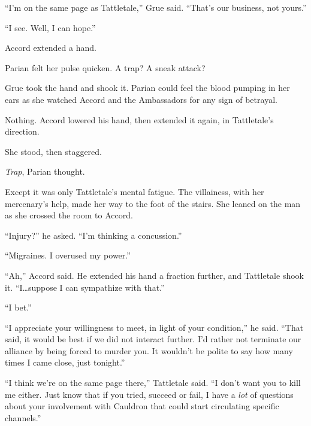 ``I'm on the same page as Tattletale,'' Grue said.  ``That's our business, not yours.''



``I see.  Well, I can hope.''



Accord extended a hand.



Parian felt her pulse quicken.  A trap?  A sneak attack?



Grue took the hand and shook it.  Parian could feel the blood pumping in her ears as she watched Accord and the Ambassadors for any sign of betrayal.



Nothing.  Accord lowered his hand, then extended it again, in Tattletale's direction.



She stood, then staggered.



\emph{Trap}, Parian thought.



Except it was only Tattletale's mental fatigue.  The villainess, with her mercenary's help, made her way to the foot of the stairs.  She leaned on the man as she crossed the room to Accord.



``Injury?'' he asked.  ``I'm thinking a concussion.''



``Migraines.  I overused my power.''



``Ah,'' Accord said.  He extended his hand a fraction further, and Tattletale shook it.  ``I\ldots suppose I can sympathize with that.''



``I bet.''



``I appreciate your willingness to meet, in light of your condition,'' he said.  ``That said, it would be best if we did not interact further.  I'd rather not terminate our alliance by being forced to murder you.  It wouldn't be polite to say how many times I came close, just tonight.''



``I think we're on the same page there,'' Tattletale said.  ``I don't want you to kill me either.  Just know that if you tried, succeed or fail, I have a \emph{lot} of questions about your involvement with Cauldron that could start circulating specific channels.''



